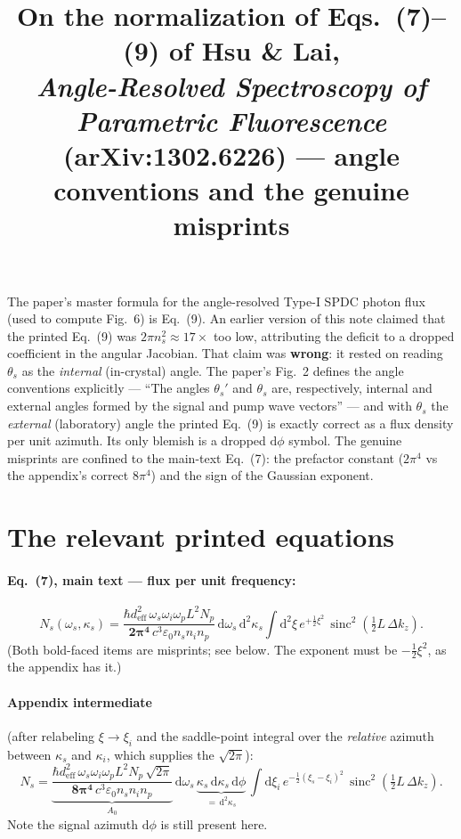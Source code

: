 \documentclass[11pt]{article}
\title{On the normalization of Eqs.~(7)--(9) of Hsu \& Lai,\\
\emph{Angle-Resolved Spectroscopy of Parametric Fluorescence}\\
\large (arXiv:1302.6226) --- angle conventions and the genuine misprints}
\author{}
\date{}
\newcommand{\sinc}{\operatorname{sinc}}
\newcommand{\dd}{\mathrm{d}}
\begin{document}
\maketitle

\noindent
The paper's master formula for the angle-resolved Type-I SPDC photon flux
(used to compute Fig.~6) is Eq.~(9). An earlier version of this note claimed
that the printed Eq.~(9) was $2\pi n_s^2 \approx 17\times$ too low, attributing
the deficit to a dropped coefficient in the angular Jacobian. That claim was
\textbf{wrong}: it rested on reading $\theta_s$ as the \emph{internal}
(in-crystal) angle. The paper's Fig.~2 defines the angle conventions
explicitly --- ``The angles $\theta_s'$ and $\theta_s$ are, respectively,
internal and external angles formed by the signal and pump wave vectors'' ---
and with $\theta_s$ the \emph{external} (laboratory) angle the printed
Eq.~(9) is exactly correct as a flux density per unit azimuth. Its only
blemish is a dropped $\dd\phi$ symbol. The genuine misprints are confined to
the main-text Eq.~(7): the prefactor constant ($2\pi^4$ vs the appendix's
correct $8\pi^4$) and the sign of the Gaussian exponent.

\section*{The relevant printed equations}

\paragraph{Eq.~(7), main text --- flux per unit frequency:}
\begin{equation}
N_s(\omega_s,\kappa_s) =
\frac{\hbar d_{\mathrm{eff}}^2\,\omega_s\omega_i\omega_p L^2 N_p}
{\mathbf{2\pi^4}\, c^3\varepsilon_0 n_s n_i n_p}\,
\dd\omega_s\,\dd^2\kappa_s
\int \dd^2\xi\,
e^{+\frac12\xi^2}\,
\sinc^2\!\left(\tfrac12 L\,\Delta k_z\right).
\tag{7}
\end{equation}
(Both bold-faced items are misprints; see below. The exponent must be
$-\tfrac12\xi^2$, as the appendix has it.)

\paragraph{Appendix intermediate} (after relabeling $\xi\to\xi_i$ and the
saddle-point integral over the \emph{relative} azimuth between
$\kappa_s$ and $\kappa_i$, which supplies the $\sqrt{2\pi}$):
\begin{equation}
N_s =
\underbrace{\frac{\hbar d_{\mathrm{eff}}^2\,\omega_s\omega_i\omega_p L^2 N_p\,\sqrt{2\pi}}
{\mathbf{8\pi^4}\, c^3\varepsilon_0 n_s n_i n_p}}_{\textstyle A_0}\,
\dd\omega_s\,\underbrace{\kappa_s\,\dd\kappa_s\,\dd\phi}_{=\,\dd^2\kappa_s}\,
\int \dd\xi_i\, e^{-\frac12(\xi_s-\xi_i)^2}\,
\sinc^2\!\left(\tfrac12 L\,\Delta k_z\right).
\label{eq:inter}
\end{equation}
Note the signal azimuth $\dd\phi$ is still present here.
\end{document}
